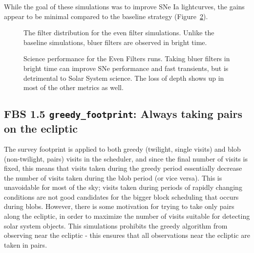 While the goal of these simulations was to improve SNe Ia lightcurves, the gains appear to be minimal compared to the baseline strategy (Figure~\ref{fig:even_filt_radar}). 


\begin{figure}
\caption{The filter distribution for the even filter simulations. Unlike the baseline simulations, bluer filters are observed in bright time.}
\label{fig:even_filt_hourglass}
\end{figure}


\begin{figure}
\caption{Science performance for the Even Filters runs.  Taking bluer filters in bright time can improve SNe performance and fast transients, but is detrimental to Solar System science.  The loss of depth shows up in most of the other metrics as well.}
\label{fig:even_filt_radar}
\end{figure}


\subsection{FBS 1.5 {\tt greedy\_footprint}: Always taking pairs on the ecliptic}\label{ss:greedy}

The survey footprint is applied to both greedy (twilight, single visits) and blob (non-twilight, pairs) visits in the scheduler, and since the final number of visits is fixed, this means that visits taken during the greedy period essentially decrease the number of visits taken during the blob period (or vice versa). This is unavoidable for most of the sky; visits taken during periods of rapidly changing conditions are not good candidates for the bigger block scheduling that occurs during blobs. However, there is some motivation for trying to take only pairs along the ecliptic, in order to maximize the number of visits suitable for detecting solar system objects. This simulations prohibits the greedy algorithm from observing near the ecliptic - this ensures that all observations near the ecliptic are taken in pairs. 

